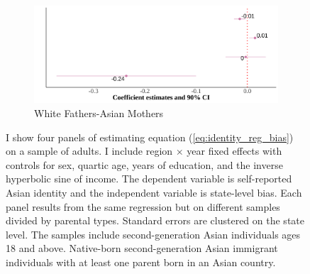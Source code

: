 \begin{center}
\begin{figure}[!htb]
\begin{subfigure}{.48\textwidth}
\caption{White Fathers-Asian Mothers}
\centering
\includegraphics[width=.9\linewidth]{by-parents-regs-wh-adults.png}
\end{subfigure}
\caption*{\footnotesize{I show four panels of estimating equation (\ref{eq:identity_reg_bias}) on a sample of adults. I include region $\times$ year fixed effects with controls for sex, quartic age, years of education, and the inverse hyperbolic sine of income. The dependent variable is self-reported Asian identity and the independent variable is state-level bias. Each panel results from the same regression but on different samples divided by parental types. Standard errors are clustered on the state level. The samples include second-generation Asian individuals ages 18 and above. Native-born second-generation Asian immigrant individuals with at least one parent born in an Asian country.}}
\end{figure}
\end{center}


\pagebreak
\newpage



\pagebreak
\newpage

